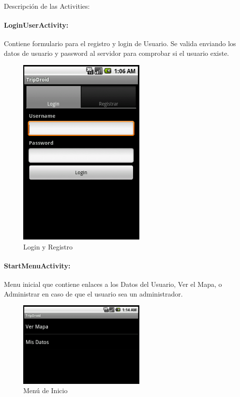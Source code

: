 \documentclass[10pt,letterpaper]{article}
\begin{document}
\newpage
Descripción de las Activities:\\

\paragraph{LoginUserActivity:} Contiene formulario para el registro y login de Usuario. Se valida enviando los datos de usuario y password al servidor para comprobar si el usuario existe.


\begin{figure}[h]
\begin{center}
\includegraphics[width=180pt]{./imgs/TripdroidLogin.png}
\caption{Login y Registro}
\end{center}
\end{figure}

\newpage
\paragraph{StartMenuActivity:} Menu inicial que contiene enlaces a los Datos del Usuario, Ver el Mapa, o Administrar en caso de que el usuario sea un administrador.

\begin{figure}[h]
\begin{center}
\includegraphics[width=180pt]{./imgs/TripdroidStartMenu.png}
\caption{Menú de Inicio}
\end{center}
\end{figure}
\end{document}
